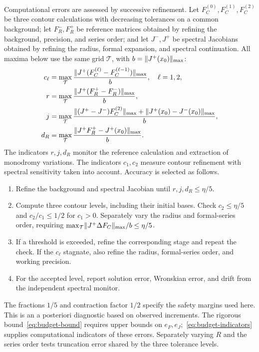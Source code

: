 Computational errors are assessed by successive refinement.
Let $F_C^{(0)},F_C^{(1)},F_C^{(2)}$ be three contour calculations with
decreasing tolerances on a common background; let $F_R^-,F_R^+$ be
reference matrices obtained by refining the background, precision, and
series order; and let $J^-,J^+$ be spectral Jacobians obtained by refining
the radius, formal expansion, and spectral continuation.
All maxima below use the same grid $\mathcal T$, with
$b=\lVert J^+(x_0)\rVert_{\max}$:
\begin{equation}\label{eq:budget-indicators}
 \begin{aligned}
 c_\ell&=\max_{\mathcal T}
   \frac{\lVert J^+(F_C^{(\ell)}-F_C^{(\ell-1)})\rVert_{\max}}{b},\quad\ell=1,2,\\
 r&=\max_{\mathcal T}\frac{\lVert J^+(F_R^+-F_R^-)\rVert_{\max}}{b},\\
 j&=\max_{\mathcal T}
   \frac{\lVert(J^+-J^-)F_C^{(2)}\rVert_{\max}+\lVert J^+(x_0)-J^-(x_0)\rVert_{\max}}{b},\\
 d_R&=\max_{\mathcal T}\frac{\lVert J^+F_R^+-J^+(x_0)\rVert_{\max}}{b}.
 \end{aligned}
\end{equation}
The indicators $r,j,d_R$ monitor the reference calculation and extraction
of monodromy variations. The indicators $c_1,c_2$ measure contour
refinement with spectral sensitivity taken into account.
Accuracy is selected as follows.
\begin{enumerate}
\item Refine the background and spectral Jacobian until
$r,j,d_R\le\eta/5$.
\item Compute three contour levels, including their initial bases.
Check $c_2\le\eta/5$ and $c_2/c_1\le1/2$ for $c_1>0$.
Separately vary the radius and formal-series order, requiring
$\max_{\mathcal T}\lVert J^+\Delta F_C\rVert_{\max}/b\le\eta/5$.
\item If a threshold is exceeded, refine the corresponding stage and
repeat the check. If the $c_\ell$ stagnate, also refine the radius,
formal-series order, and working precision.
\item For the accepted level, report solution error, Wronskian error,
and drift from the independent spectral monitor.
\end{enumerate}
The fractions $1/5$ and contraction factor $1/2$ specify the safety
margins used here. This is an a posteriori diagnostic based on observed
increments. The rigorous bound~\eqref{eq:budget-bound} requires upper
bounds on $e_F,e_J$;~\eqref{eq:budget-indicators} supplies computational
indicators of these errors. Separately varying $R$ and the series order
tests truncation error shared by the three tolerance levels.

